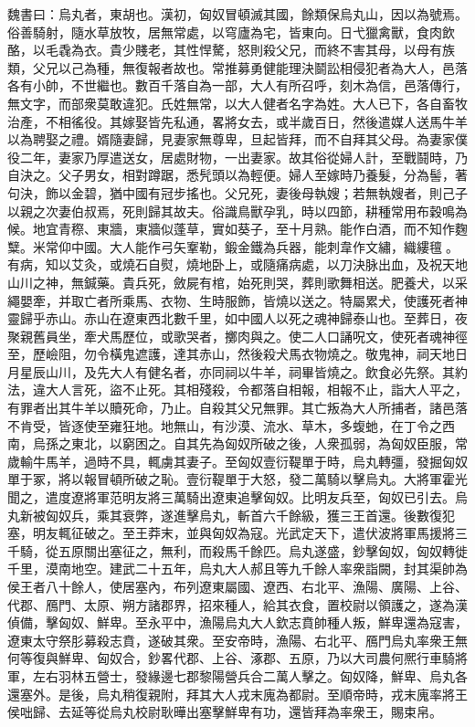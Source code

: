 \begin{pinyinscope}
魏書曰：烏丸者，東胡也。漢初，匈奴冒頓滅其國，餘類保烏丸山，因以為號焉。俗善騎射，隨水草放牧，居無常處，以穹廬為宅，皆東向。日弋獵禽獸，食肉飲酪，以毛毳為衣。貴少賤老，其性悍驁，怒則殺父兄，而終不害其母，以母有族類，父兄以己為種，無復報者故也。常推募勇健能理決鬬訟相侵犯者為大人，邑落各有小帥，不世繼也。數百千落自為一部，大人有所召呼，刻木為信，邑落傳行，無文字，而部衆莫敢違犯。氏姓無常，以大人健者名字為姓。大人已下，各自畜牧治產，不相徭役。其嫁娶皆先私通，畧將女去，或半歲百日，然後遣媒人送馬牛羊以為聘娶之禮。婿隨妻歸，見妻家無尊卑，旦起皆拜，而不自拜其父母。為妻家僕役二年，妻家乃厚遣送女，居處財物，一出妻家。故其俗從婦人計，至戰鬪時，乃自決之。父子男女，相對蹲踞，悉髠頭以為輕便。婦人至嫁時乃養髮，分為髻，著句決，飾以金碧，猶中國有冠步搖也。父兄死，妻後母執嫂；若無執嫂者，則己子以親之次妻伯叔焉，死則歸其故夫。俗識鳥獸孕乳，時以四節，耕種常用布穀鳴為候。地宜青穄、東牆，東牆似蓬草，實如葵子，至十月熟。能作白酒，而不知作麴糱。米常仰中國。大人能作弓矢鞌勒，鍛金鐵為兵器，能刺韋作文繡，織縷氊𣮷。有病，知以艾灸，或燒石自熨，燒地卧上，或隨痛病處，以刀決脉出血，及祝天地山川之神，無鍼藥。貴兵死，斂屍有棺，始死則哭，葬則歌舞相送。肥養犬，以采繩嬰牽，并取亡者所乘馬、衣物、生時服飾，皆燒以送之。特屬累犬，使護死者神靈歸乎赤山。赤山在遼東西北數千里，如中國人以死之魂神歸泰山也。至葬日，夜聚親舊員坐，牽犬馬歷位，或歌哭者，擲肉與之。使二人口誦呪文，使死者魂神徑至，歷嶮阻，勿令橫鬼遮護，達其赤山，然後殺犬馬衣物燒之。敬鬼神，祠天地日月星辰山川，及先大人有健名者，亦同祠以牛羊，祠畢皆燒之。飲食必先祭。其約法，違大人言死，盜不止死。其相殘殺，令都落自相報，相報不止，詣大人平之，有罪者出其牛羊以贖死命，乃止。自殺其父兄無罪。其亡叛為大人所捕者，諸邑落不肯受，皆逐使至雍狂地。地無山，有沙漠、流水、草木，多蝮虵，在丁令之西南，烏孫之東北，以窮困之。自其先為匈奴所破之後，人衆孤弱，為匈奴臣服，常歲輸牛馬羊，過時不具，輒虜其妻子。至匈奴壹衍鞮單于時，烏丸轉彊，發掘匈奴單于冢，將以報冒頓所破之恥。壹衍鞮單于大怒，發二萬騎以擊烏丸。大將軍霍光聞之，遣度遼將軍范明友將三萬騎出遼東追擊匈奴。比明友兵至，匈奴已引去。烏丸新被匈奴兵，乘其衰弊，遂進擊烏丸，斬首六千餘級，獲三王首還。後數復犯塞，明友輒征破之。至王莽末，並與匈奴為寇。光武定天下，遣伏波將軍馬援將三千騎，從五原關出塞征之，無利，而殺馬千餘匹。烏丸遂盛，鈔擊匈奴，匈奴轉徙千里，漠南地空。建武二十五年，烏丸大人郝且等九千餘人率衆詣闕，封其渠帥為侯王者八十餘人，使居塞內，布列遼東屬國、遼西、右北平、漁陽、廣陽、上谷、代郡、鴈門、太原、朔方諸郡界，招來種人，給其衣食，置校尉以領護之，遂為漢偵備，擊匈奴、鮮卑。至永平中，漁陽烏丸大人欽志賁帥種人叛，鮮卑還為寇害，遼東太守祭肜募殺志賁，遂破其衆。至安帝時，漁陽、右北平、鴈門烏丸率衆王無何等復與鮮卑、匈奴合，鈔畧代郡、上谷、涿郡、五原，乃以大司農何熈行車騎將軍，左右羽林五營士，發緣邊七郡黎陽營兵合二萬人擊之。匈奴降，鮮卑、烏丸各還塞外。是後，烏丸稍復親附，拜其大人戎末廆為都尉。至順帝時，戎末廆率將王侯咄歸、去延等從烏丸校尉耿曄出塞擊鮮卑有功，還皆拜為率衆王，賜束帛。


\end{pinyinscope}